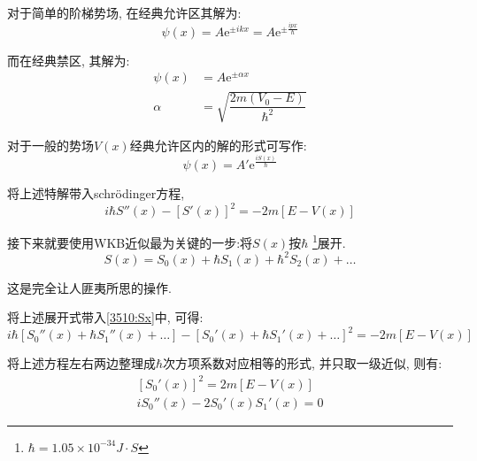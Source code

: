 \documentclass[a4paper, 11pt]{article}
\begin{document}
\begin{spacing}{1.2}
          对于简单的阶梯势场, 在经典允许区其解为:
          \begin{equation}
            \psi(x) = A\mathrm{e}^{\pm{}ikx} = A\mathrm{e}^{\pm\frac{ipx}{\hbar}}
          \end{equation}

          而在经典禁区, 其解为:
          \begin{equation}
            \begin{aligned}
              \psi(x) &= A\mathrm{e}^{\pm\alpha{}x}\\
              \alpha &= \sqrt{\dfrac{2m(V_0-E)}{\hbar^2}}
            \end{aligned}
          \end{equation}

          对于一般的势场$V(x)$经典允许区内的解的形式可写作:
          \begin{equation}
            \psi(x) = A'\mathrm{e}^{\frac{iS(x)}{\hbar}}
          \end{equation}

          将上述特解带入schr\"odinger方程, 
          \begin{equation}
            \label{3510:Sx}
            i\hbar{}S''(x)-\left[S'(x)\right]^2 = -2m\left[E-V(x)\right]
          \end{equation}

          接下来就要使用WKB近似最为关键的一步:将$S(x)$按$\hbar$ \footnote{$\hbar = 1.05\times10^{-34}J\cdot{}S$}展开.
          \begin{equation}
            S(x) = S_0(x) + \hbar{}S_1(x) + \hbar^2{}S_2(x) + \ldots
          \end{equation}

          这是完全让人匪夷所思的操作. 

          将上述展开式带入\eqref{3510:Sx}中, 可得:
          \begin{equation}
            i\hbar\left[S_0''(x)+\hbar{}S_1''(x)+\ldots\right]-\left[S_0'(x)+\hbar{}S_1'(x)+\ldots\right]^2 = -2m\left[E-V(x)\right]
          \end{equation}

          将上述方程左右两边整理成$\hbar$次方项系数对应相等的形式, 并只取一级近似, 则有:
          \begin{equation}
            \begin{aligned}
              \left[S_0'(x)\right]^2 = 2m\left[E-V(x)\right]\\
              iS_0''(x) - 2S_0'(x)S_1'(x) = 0
            \end{aligned}
          \end{equation}


\end{spacing}
\end{document}
